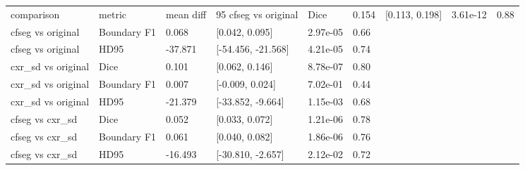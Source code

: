 \begin{tabular}{llllll}
\toprule
comparison & metric & mean diff & 95%
\midrule
cfseg vs original & Dice & 0.154 & [0.113, 0.198] & 3.61e-12 & 0.88 \\
cfseg vs original & Boundary F1 & 0.068 & [0.042, 0.095] & 2.97e-05 & 0.66 \\
cfseg vs original & HD95 & -37.871 & [-54.456, -21.568] & 4.21e-05 & 0.74 \\
cxr_sd vs original & Dice & 0.101 & [0.062, 0.146] & 8.78e-07 & 0.80 \\
cxr_sd vs original & Boundary F1 & 0.007 & [-0.009, 0.024] & 7.02e-01 & 0.44 \\
cxr_sd vs original & HD95 & -21.379 & [-33.852, -9.664] & 1.15e-03 & 0.68 \\
cfseg vs cxr_sd & Dice & 0.052 & [0.033, 0.072] & 1.21e-06 & 0.78 \\
cfseg vs cxr_sd & Boundary F1 & 0.061 & [0.040, 0.082] & 1.86e-06 & 0.76 \\
cfseg vs cxr_sd & HD95 & -16.493 & [-30.810, -2.657] & 2.12e-02 & 0.72 \\
\bottomrule
\end{tabular}
